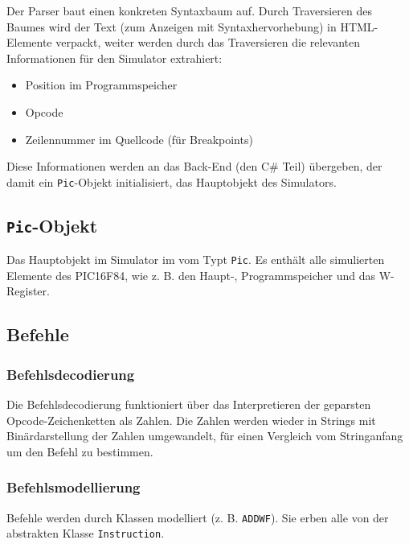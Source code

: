 
Der Parser baut einen konkreten Syntaxbaum auf.
Durch Traversieren des Baumes wird der Text (zum Anzeigen mit Syntaxhervorhebung) in HTML-Elemente verpackt,
weiter werden durch das Traversieren die relevanten Informationen für den Simulator extrahiert:

\begin{itemize}
    \item Position im Programmspeicher
    \item Opcode 
    \item Zeilennummer im Quellcode (für Breakpoints)
\end{itemize}

Diese Informationen werden an das Back-End (den C\# Teil) übergeben,
der damit ein \texttt{Pic}-Objekt initialisiert, das Hauptobjekt des Simulators.

\subsection{\texttt{Pic}-Objekt}
Das Hauptobjekt im Simulator im vom Typt \texttt{Pic}.
Es enthält alle simulierten Elemente des PIC16F84,
wie z. B. den Haupt-, Programmspeicher und das W-Register. 


\subsection{Befehle}

\subsubsection{Befehlsdecodierung}
Die Befehlsdecodierung funktioniert über das Interpretieren der geparsten Opcode-Zeichenketten als Zahlen.
Die Zahlen werden wieder in Strings mit Binärdarstellung der Zahlen umgewandelt,
für einen Vergleich vom Stringanfang um den Befehl zu bestimmen.


\subsubsection{Befehlsmodellierung}
Befehle werden durch Klassen modelliert (z. B. \texttt{ADDWF}).
Sie erben alle von der abstrakten Klasse \texttt{Instruction}.

